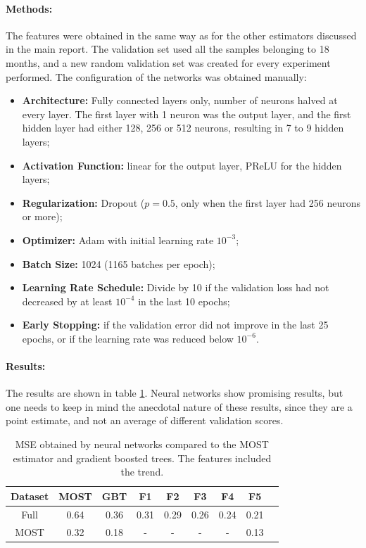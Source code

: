 \documentclass[a4paper,11pt]{kth-mag}
\begin{document}
\paragraph{Methods:}
The features were obtained in the same way as for the other estimators discussed in the main report. The validation set used all the samples belonging to 18 months, and a new random validation set was created for every experiment performed. The configuration of the networks was obtained manually:

\begin{itemize}
\item \textbf{Architecture:} Fully connected layers only, number of neurons halved at every layer. The first layer with 1 neuron was the output layer, and the first hidden layer had either 128, 256 or 512 neurons, resulting in 7 to 9 hidden layers;
\item \textbf{Activation Function:} linear for the output layer, PReLU \citep{prelu} for the hidden layers;
\item \textbf{Regularization:} Dropout ($p=0.5$, only when the first layer had 256 neurons or more);
\item \textbf{Optimizer:} Adam \citep{adam} with initial learning rate $10^{-3}$;
\item \textbf{Batch Size:} 1024 (1165 batches per epoch);
\item \textbf{Learning Rate Schedule:} Divide by 10 if the validation loss had not decreased by at least $10^{-4}$ in the last 10 epochs;
\item \textbf{Early Stopping:} if the validation error did not improve in the last 25 epochs, or if the learning rate was reduced below $10^{-6}$.
\end{itemize}

\paragraph{Results:}
The results are shown in table \ref{tbl:nnets}. Neural networks show promising results, but one needs to keep in mind the anecdotal nature of these results, since they are a point estimate, and not an average of different validation scores.

\begin{table}
\caption{MSE obtained by neural networks compared to the MOST estimator and gradient boosted trees. The features included the trend.}
\label{tbl:nnets}
\centering
\begin{tabular}{ccc|cccccc}
\toprule
\textbf{Dataset} & \textbf{MOST} & \textbf{GBT} & \textbf{F1} & \textbf{F2} & \textbf{F3} & \textbf{F4} & \textbf{F5} \\
\midrule
Full & 0.64 & 0.36 & 0.31 & 0.29 & 0.26 & 0.24 & 0.21 \\
MOST & 0.32 & 0.18 & - & - & - & - & 0.13 \\
\bottomrule
\end{tabular}
\end{table}
\end{document}
